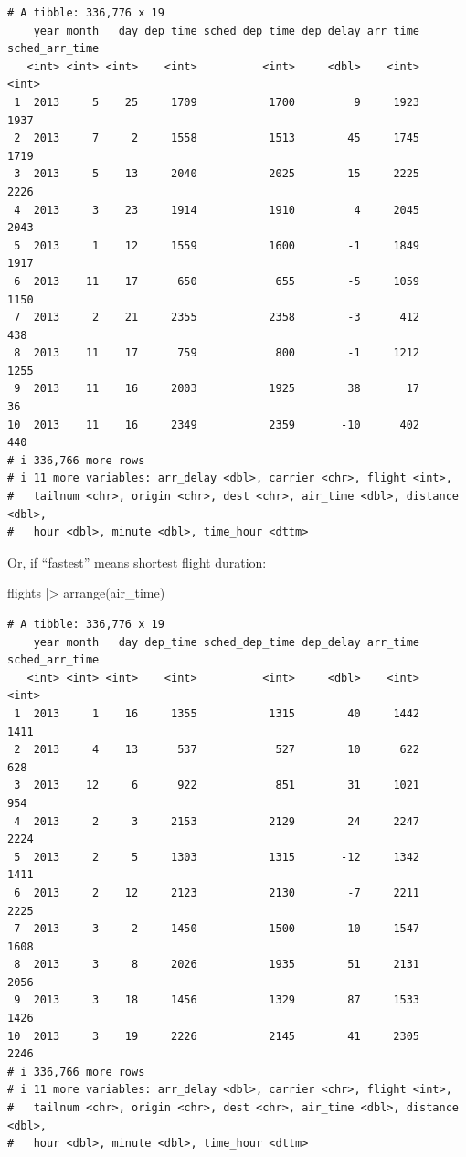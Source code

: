 \documentclass[
  letterpaper,
  DIV=11,
  numbers=noendperiod]{scrreprt}
\newenvironment{Shaded}{\begin{snugshade}}{\end{snugshade}}
\newcommand{\FunctionTok}[1]{\textcolor[rgb]{0.28,0.35,0.67}{#1}}
\newcommand{\NormalTok}[1]{\textcolor[rgb]{0.00,0.23,0.31}{#1}}
\newcommand{\SpecialCharTok}[1]{\textcolor[rgb]{0.37,0.37,0.37}{#1}}
\begin{document}
\begin{verbatim}
# A tibble: 336,776 x 19
    year month   day dep_time sched_dep_time dep_delay arr_time sched_arr_time
   <int> <int> <int>    <int>          <int>     <dbl>    <int>          <int>
 1  2013     5    25     1709           1700         9     1923           1937
 2  2013     7     2     1558           1513        45     1745           1719
 3  2013     5    13     2040           2025        15     2225           2226
 4  2013     3    23     1914           1910         4     2045           2043
 5  2013     1    12     1559           1600        -1     1849           1917
 6  2013    11    17      650            655        -5     1059           1150
 7  2013     2    21     2355           2358        -3      412            438
 8  2013    11    17      759            800        -1     1212           1255
 9  2013    11    16     2003           1925        38       17             36
10  2013    11    16     2349           2359       -10      402            440
# i 336,766 more rows
# i 11 more variables: arr_delay <dbl>, carrier <chr>, flight <int>,
#   tailnum <chr>, origin <chr>, dest <chr>, air_time <dbl>, distance <dbl>,
#   hour <dbl>, minute <dbl>, time_hour <dttm>
\end{verbatim}

Or, if ``fastest'' means shortest flight duration:

\begin{Shaded}
\begin{Highlighting}[]
\NormalTok{flights }\SpecialCharTok{|\textgreater{}}
  \FunctionTok{arrange}\NormalTok{(air\_time)}
\end{Highlighting}
\end{Shaded}

\begin{verbatim}
# A tibble: 336,776 x 19
    year month   day dep_time sched_dep_time dep_delay arr_time sched_arr_time
   <int> <int> <int>    <int>          <int>     <dbl>    <int>          <int>
 1  2013     1    16     1355           1315        40     1442           1411
 2  2013     4    13      537            527        10      622            628
 3  2013    12     6      922            851        31     1021            954
 4  2013     2     3     2153           2129        24     2247           2224
 5  2013     2     5     1303           1315       -12     1342           1411
 6  2013     2    12     2123           2130        -7     2211           2225
 7  2013     3     2     1450           1500       -10     1547           1608
 8  2013     3     8     2026           1935        51     2131           2056
 9  2013     3    18     1456           1329        87     1533           1426
10  2013     3    19     2226           2145        41     2305           2246
# i 336,766 more rows
# i 11 more variables: arr_delay <dbl>, carrier <chr>, flight <int>,
#   tailnum <chr>, origin <chr>, dest <chr>, air_time <dbl>, distance <dbl>,
#   hour <dbl>, minute <dbl>, time_hour <dttm>
\end{verbatim}
\end{document}
